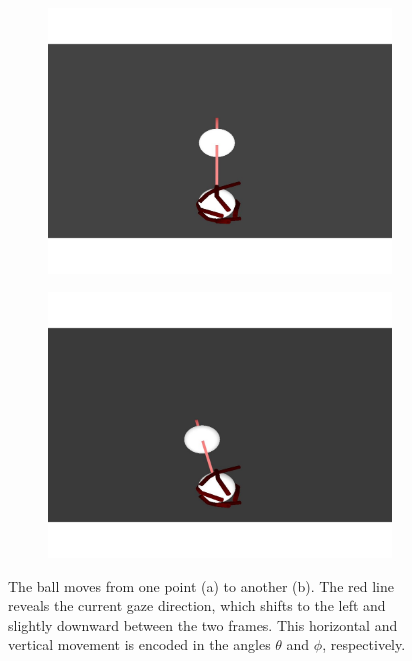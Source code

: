\documentclass [MS] {UCLAthesis}
\begin{document}
\begin{figure}
     \centering
     \begin{subfigure}{0.48\textwidth}
         \centering
         \includegraphics[width=\textwidth]{image000028}
         \caption{}
         \label{fig:ball_pos1}
     \end{subfigure}
     \hfill
     \begin{subfigure}{0.48\textwidth}
         \centering
         \includegraphics[width=\textwidth]{image000068}
         \caption{}
         \label{fig:ball_pos2}
     \end{subfigure}
    \caption[Target movement and corresponding gaze correction]{The ball moves from one point (a) to another (b). The red line reveals the current gaze direction, which shifts to the left and slightly downward between the two frames. This horizontal and vertical movement is encoded in the angles $\theta$ and $\phi$, respectively.}
    \label{fig:ball_movement}
\end{figure}
\end{document}
